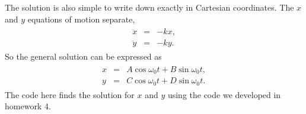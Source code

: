 \documentclass[letterpaper,10pt,english]{sphinxmanual}
\begin{document}
The solution is also simple to write down exactly in Cartesian coordinates. The \(x\) and \(y\) equations of motion separate,
\begin{equation*}
\begin{split}
\begin{eqnarray*}
\ddot{x}&=&-kx,\\
\ddot{y}&=&-ky.
\end{eqnarray*}
\end{split}
\end{equation*}
So the general solution can be expressed as
\begin{equation*}
\begin{split}
\begin{eqnarray*}
x&=&A\cos\omega_0 t+B\sin\omega_0 t,\\
y&=&C\cos\omega_0 t+D\sin\omega_0 t.
\end{eqnarray*}
\end{split}
\end{equation*}
The code here finds the solution for \(x\) and \(y\) using the code we developed in homework 4.
\end{document}
